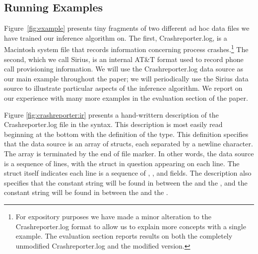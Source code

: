 \subsection{Running Examples}

Figure~\ref{fig:example} presents tiny fragments of two
different ad hoc data files we have trained our inference algorithm
on.  The first, Crashreporter.log, is a Macintosh
system file that records information concerning process crashes.\footnote{For
expository purposes we have made a minor alteration to the Crashreporter.log
format to allow us to explain more concepts with a single example.
The evaluation section reports results on both the  
completely unmodified Crashreporter.log and the modified version.} 
The second, which we call Sirius, is an internal AT\&T format used to
record phone call provisioning information. 
We will use the Crashreporter.log data source as our main example throughout the
paper; we will periodically use the Sirius data source to illustrate 
particular aspects of the inference algorithm.  We report on our experience
with many more examples in the evaluation section of the paper.



Figure \ref{fig:crashreporter:ir} presents a hand-writtern description
of the Crashreporter.log file in the \ir{} syntax.  This
description is most easily read beginning at the bottom
with the definition of the  type.  This definition specifies that
the data source is an
array of structs, each separated by a newline character. The array
is terminated by the end of file marker.  In other words,
the data source is a sequence of lines, with the struct
in question appearing on each line.  
The struct itself indicates each line is a sequence of
, ,  and  fields.  
The description also specifies that the constant string \cd{"["} 
will be found in between the  and the , and the
constant string \cd{"]: "} will be found in between the  and 
the .


